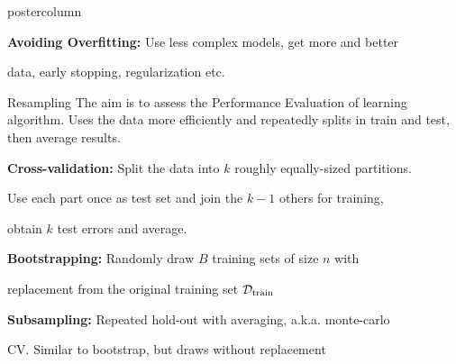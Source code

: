 \documentclass{beamer}
\begin{document}
\begin{frame}[fragile]{}
\begin{columns}
\begin{column}{.31\textwidth}
\begin{beamercolorbox}[center]{postercolumn}
\begin{minipage}{.98\textwidth}
{\begin{myblock}{ }
    \vspace*{1ex}
    
    \begin{codebox}	
    \textbf{Avoiding Overfitting: }Use less complex models, get more and better
    \end{codebox}
    
    \begin{codebox}	
    data, early stopping, regularization etc.
    \end{codebox}
   
    \end{myblock}
    
    \begin{myblock}{Resampling}
    The aim is to assess the Performance Evaluation of learning algorithm. Uses the data more efficiently and repeatedly splits in train and test, then average results.
    \vspace*{1ex}
    
    \begin{codebox}
    \textbf{Cross-validation: }Split the data into $k$ roughly equally-sized partitions.
    \end{codebox}
    
    \begin{codebox}
    Use each part once as test set and join the $k-1$ others for training, 
    \end{codebox}
    
    \begin{codebox}
    obtain $k$ test errors and average.
    \end{codebox}
    
    \vspace*{1ex}
    
    \begin{codebox}
    \textbf{Bootstrapping: }Randomly draw $B$ training sets of size $n$ with
    \end{codebox}
    \begin{codebox}
    replacement from the original training set $\mathcal{D}_{\text{train}}$
      \end{codebox}
      
    \vspace*{1ex}
    
    \begin{codebox}
    \textbf{Subsampling: }Repeated hold-out with averaging, a.k.a. monte-carlo 
    \end{codebox}
    
    \begin{codebox}
    CV. Similar to bootstrap, but draws without replacement
    \end{codebox}
    
    \end{myblock}
  }
  \end{minipage}
  \end{beamercolorbox}
  \end{column}
\end{columns}
\end{frame}
\end{document}
